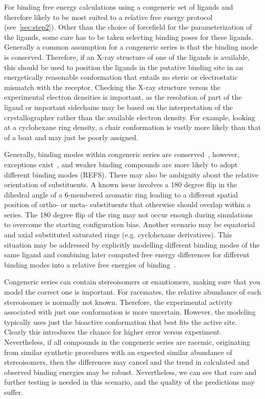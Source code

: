 \documentclass[9pt,bestpractices]{livecoms}
\begin{document}
For binding free energy calculations using a congeneric set of ligands and therefore likely to be most suited to a relative free energy protocol (see~\ref{sec:step2}). Other than the choice of forcefield for the parameterization of the ligands, some care has to be taken selecting binding poses for these ligands. Generally a common assumption for a congeneric series is that the binding mode is conserved. Therefore, if an X-ray structure of one of the ligands is available, this should be used to position the ligands in the putative binding site in an energetically reasonable conformation that entails no steric or electrostatic mismatch with the receptor. Checking the X-ray structure versus the experimental electron densities is important, as the resolution of part of the ligand or important sidechains may be based on the interpretation of the crystallographer rather than the available electron density. For example, looking at a cyclohexane ring density, a chair conformation is vastly more likely than that of a boat and may just be poorly assigned. 

Generally, binding modes within congeneric series are conserved~\cite{}, however, exceptions exist~\cite{}, and weaker binding compounds are more likely to adopt different binding modes (REFS). There may also be ambiguity about the relative orientation of substituents. A known issue involves a 180 degree flip in the dihedral angle of a 6-membered aromatic ring leading to a different spatial position of ortho- or meta- substituents that otherwise should overlap within a series. The 180 degree flip of the ring may not occur enough during simulations to overcome the starting configuration bias. Another scenario may be equatorial and axial substituted saturated rings (e.g. cyclohexane derivatives). This situation may be addressed by explicitly modelling different binding modes of the same ligand and combining later computed free energy differences for different binding modes into a relative free energies of binding~\cite{kaus2015how}.

Congeneric series can contain stereoisomers or enantiomers, making sure that you model the correct one is important. For racemates, the relative abundance of each stereoisomer is normally not known. Therefore, the experimental activity associated with just one conformation is more uncertain. However, the modeling typically uses just the bioactive conformation that best fits the active site. Clearly this introduces the chance for higher error versus experiment. Nevertheless, if all compounds in the congeneric series are racemic, originating from similar synthetic procedures with an expected similar abundance of stereoisomers, then the differences may cancel and the trend in calculated and observed binding energies may be robust. Nevertheless, we can see that care and further testing is needed in this scenario, and the quality of the predictions may suffer.   
\end{document}
